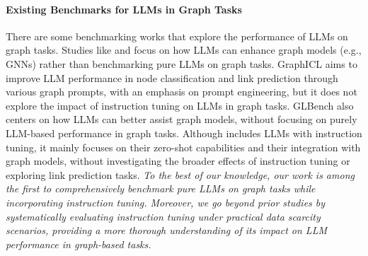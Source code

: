





\paragraph{\textbf{Existing Benchmarks for LLMs in Graph Tasks}}
There are some benchmarking works that explore the performance of LLMs on graph tasks. Studies like \cite{chen2024text} and \cite{yan2023comprehensive} focus on how LLMs can enhance graph models (e.g., GNNs) rather than benchmarking pure LLMs on graph tasks. GraphICL \cite{sun2025graphicl} aims to improve LLM performance in node classification and link prediction through various graph prompts, with an emphasis on prompt engineering, but it does not explore the impact of instruction tuning on LLMs in graph tasks. GLBench \cite{li2024glbench} also centers on how LLMs can better assist graph models, without focusing on purely LLM-based performance in graph tasks. Although \cite{wu2025comprehensive} includes LLMs with instruction tuning, it mainly focuses on their zero-shot capabilities and their integration with graph models, without investigating the broader effects of instruction tuning or exploring link prediction tasks. \emph{To the best of our knowledge, our work is among the first to comprehensively benchmark pure LLMs on graph tasks while incorporating instruction tuning.  Moreover, we go beyond prior studies by systematically evaluating instruction tuning under practical data scarcity scenarios, providing a more thorough understanding of its impact on LLM performance in graph-based tasks.}



